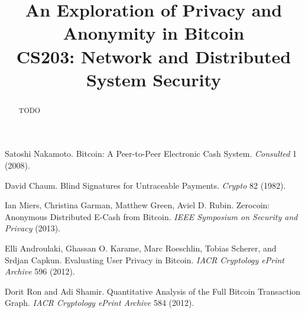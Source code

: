 \documentclass[conference]{IEEEtran}
\begin{document}
\title{An Exploration of Privacy and Anonymity in Bitcoin \\ {\LARGE CS203: Network and Distributed System Security}}


\author{
\and
{}
}

\maketitle

\begin{abstract}
TODO
\end{abstract}

\IEEEpeerreviewmaketitle









\begin{thebibliography}{1}

 Satoshi Nakamoto. Bitcoin: A Peer-to-Peer Electronic Cash System. \emph{Consulted} 1 (2008).

 David Chaum. Blind Signatures for Untraceable Payments. \emph{Crypto} 82 (1982).

 Ian Miers, Christina Garman, Matthew Green, Aviel D. Rubin. Zerocoin: Anonymous Distributed E-Cash from Bitcoin. \emph{IEEE Symposium on Security and Privacy} (2013).

 Elli Androulaki, Ghassan O. Karame, Marc Roeschlin, Tobias Scherer, and Srdjan Capkun. Evaluating User Privacy in Bitcoin. \emph{IACR Cryptology ePrint Archive} 596 (2012).

 Dorit Ron and Adi Shamir. Quantitative Analysis of the Full Bitcoin Transaction Graph. \emph{IACR Cryptology ePrint Archive} 584 (2012).




\end{thebibliography}




\end{document}
